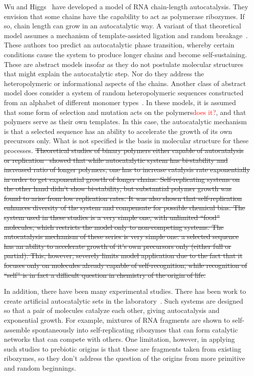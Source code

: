\documentclass[journal=jacsat,manuscript=article,layout=twocolumn]{achemso}
\newcommand*{\red}[1]{\textcolor{red}{#1}}
\begin{document}
Wu and Higgs~\cite{Wu2009} have developed a model of RNA chain-length autocatalysis.  They envision 
that some chains have the capability to act as polymerase ribozymes.  If so, chain length can grow 
in an autocatalytic way.  A variant of that theoretical model assumes a mechanism of 
template-assisted ligation and random breakage~\cite{Tkachenko2014}.  These authors too predict an 
autocatalytic phase transition, whereby certain conditions cause the system to produce longer 
chains and become self-sustaining.  These are abstract models insofar as they do not postulate 
molecular structures that might explain the autocatalytic step.  Nor do they address the 
heteropolymeric or informational aspects of the chains.  Another class of abstract model does 
consider a system of random heteropolymeric sequences constructed from an alphabet of different 
monomer types~\cite{nowak2008prevolutionary,Ohtsuki2009,Chen2012,Derr2012}.  In these models, it is 
assumed that some form of selection and mutation acts on the polymers\red{does it?}, and that 
polymers serve as their own templates.  In this case, the autocatalytic mechanism is that a 
selected sequence has an ability to accelerate the growth of its own precursors only.  What is not 
specified is the basis in molecular structure for these processes. \sout{Theoretical studies of 
binary polymers either 
capable of autocatalysis or 
replication~\cite{nowak2008prevolutionary,Ohtsuki2009,Chen2012,Derr2012} showed that while 
autocatalytic system has bi-stability and increased ratio of longer 
polymers, one has to increase catalysis rate exponentially in order to get exponential growth of 
longer chains. Self-replicating systems on the other hand didn't show bi-stability, but 
substantial 
polymer growth was found to arise from low replication rates. It was also shown that 
self-replication enhances diversity of the system and compensate for possible chemical bias. The 
system used in these 
studies is a very simple one, with unlimited ``food'' molecules, which restricts the model only to 
non-competing systems. The autocatalysis mechanism of these series is very simple one: a selected 
sequence has an ability to accelerate growth of it's own precursors only (either full or partial). 
This, however, severely limits model application due to the fact 
that it 
focuses only on molecules already capable of self-recognition, while recognition of ``self'' is in 
fact a difficult question in chemistry of the origin of life.}
 
 In addition, there have been many experimental studies.  There has been work to create artificial 
autocatalytic sets in the laboratory~\cite{VonKiedrowski1986,Lincoln2009,Vaidya2012}. Such systems 
are designed so that a pair of molecules catalyze each other, giving autocatalysis and exponential 
growth.  For example, mixtures of RNA fragments are shown to self-assemble spontaneously into 
self-replicating ribozymes that can form catalytic networks that can compete with others.  One 
limitation, however, in applying such studies to prebiotic origins is that these are fragments 
taken from existing ribozymes, so they don't address the question of the origins from more 
primitive and random beginnings.
 
\end{document}
